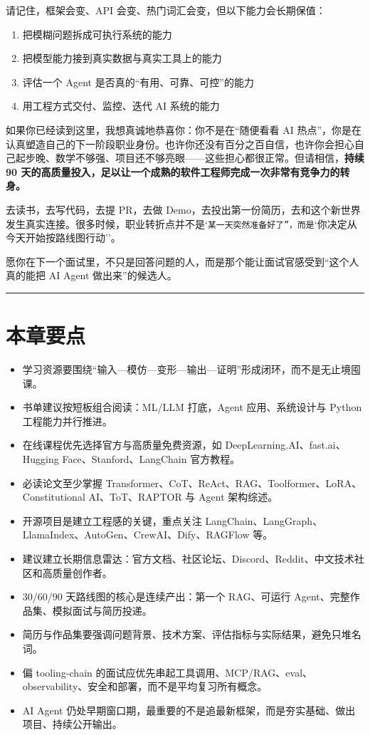 请记住，框架会变、API 会变、热门词汇会变，但以下能力会长期保值：


\begin{enumerate}[leftmargin=2em]
\item 把模糊问题拆成可执行系统的能力
\item 把模型能力接到真实数据与真实工具上的能力
\item 评估一个 Agent 是否真的``有用、可靠、可控''的能力
\item 用工程方式交付、监控、迭代 AI 系统的能力
\end{enumerate}

如果你已经读到这里，我想真诚地恭喜你：你不是在``随便看看 AI 热点''，你是在认真塑造自己的下一阶段职业身份。也许你还没有百分之百自信，也许你会担心自己起步晚、数学不够强、项目还不够亮眼------这些担心都很正常。但请相信，\textbf{持续 90 天的高质量投入，足以让一个成熟的软件工程师完成一次非常有竞争力的转身。}


去读书，去写代码，去提 PR，去做 Demo，去投出第一份简历，去和这个新世界发生真实连接。很多时候，职业转折点并不是`\texttt{某一天突然准备好了''，而是}`你决定从今天开始按路线图行动''。


愿你在下一个面试里，不只是回答问题的人，而是那个能让面试官感受到``这个人真的能把 AI Agent 做出来''的候选人。


\bigskip\hrule\bigskip

\section{本章要点}

\begin{itemize}[leftmargin=2em]
\item 学习资源要围绕``输入---模仿---变形---输出---证明''形成闭环，而不是无止境囤课。
\item 书单建议按短板组合阅读：ML/LLM 打底，Agent 应用、系统设计与 Python 工程能力并行推进。
\item 在线课程优先选择官方与高质量免费资源，如 DeepLearning.AI、fast.ai、Hugging Face、Stanford、LangChain 官方教程。
\item 必读论文至少掌握 Transformer、CoT、ReAct、RAG、Toolformer、LoRA、Constitutional AI、ToT、RAPTOR 与 Agent 架构综述。
\item 开源项目是建立工程感的关键，重点关注 LangChain、LangGraph、LlamaIndex、AutoGen、CrewAI、Dify、RAGFlow 等。
\item 建议建立长期信息雷达：官方文档、社区论坛、Discord、Reddit、中文技术社区和高质量创作者。
\item 30/60/90 天路线图的核心是连续产出：第一个 RAG、可运行 Agent、完整作品集、模拟面试与简历投递。
\item 简历与作品集要强调问题背景、技术方案、评估指标与实际结果，避免只堆名词。
\item 偏 tooling-chain 的面试应优先串起工具调用、MCP/RAG、eval、observability、安全和部署，而不是平均复习所有概念。
\item AI Agent 仍处早期窗口期，最重要的不是追最新框架，而是夯实基础、做出项目、持续公开输出。
\end{itemize}
